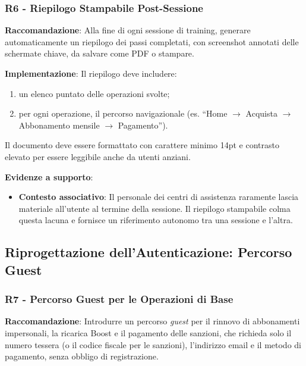 ﻿\documentclass[11pt,a4paper]{article}
\begin{document}
\subsubsection{R6 - Riepilogo Stampabile Post-Sessione}
\label{rec:R6}

\textbf{Raccomandazione}: Alla fine di ogni sessione di training, generare
automaticamente un riepilogo dei passi completati, con screenshot annotati
delle schermate chiave, da salvare come PDF o stampare.

\textbf{Implementazione}: Il riepilogo deve includere:
\begin{enumerate}
    \item un elenco puntato delle operazioni svolte;
    \item per ogni operazione, il percorso navigazionale (es.
    “Home $\rightarrow$ Acquista $\rightarrow$ Abbonamento mensile $\rightarrow$ Pagamento”).
\end{enumerate}
Il documento deve essere formattato con carattere minimo 14pt e contrasto
elevato per essere leggibile anche da utenti anziani.

\textbf{Evidenze a supporto}:
\begin{itemize}
    \item \textbf{Contesto associativo}: Il personale dei centri di
    assistenza raramente lascia materiale all'utente al termine della
    sessione. Il riepilogo stampabile colma questa lacuna e fornisce un
    riferimento autonomo tra una sessione e l'altra.
\end{itemize}



\subsection{Riprogettazione dell'Autenticazione: Percorso Guest}

\subsubsection{R7 - Percorso Guest per le Operazioni di Base}
\label{rec:R7}

\textbf{Raccomandazione}: Introdurre un percorso \textit{guest} per il
rinnovo di abbonamenti impersonali, la ricarica Boost e il pagamento
delle sanzioni, che richieda solo il numero tessera (o il codice fiscale
per le sanzioni), l'indirizzo email e il metodo di pagamento, senza
obbligo di registrazione.
\end{document}
